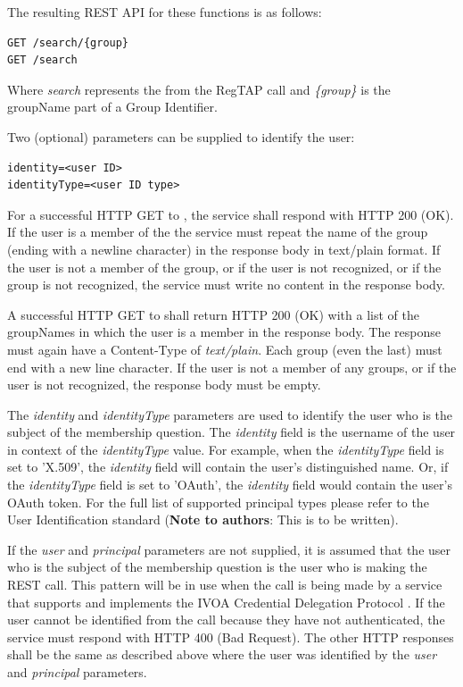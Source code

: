 \documentclass[11pt,a4paper]{ivoa}
\begin{document}
The resulting REST API for these functions is as follows:

\begin{verbatim}
GET /search/{group}
GET /search
\end{verbatim}

Where \emph{search} represents the  from the RegTAP call and \emph{\{group\}} is the groupName part of a Group Identifier.

Two (optional) parameters can be supplied to identify the user:

\begin{verbatim}
identity=<user ID>
identityType=<user ID type>
\end{verbatim}

For a successful HTTP GET to , the service shall respond with HTTP 200 (OK).  If the user is a member of the  the service must repeat the name of the group (ending with a newline character) in the response body in text/plain format.  If the user is not a member of the group, or if the user is not recognized, or if the group is not recognized, the service must write no content in the response body.

A successful HTTP GET to  shall return HTTP 200 (OK) with a list of the groupNames in which the user is a member in the response body.  The response must again have a Content-Type of \emph {text/plain}.  Each group (even the last) must end with a new line character.  If the user is not a member of any groups, or if the user is not recognized, the response body must be empty.

The \emph{identity} and \emph{identityType} parameters are used to identify the user who is the subject of the membership question.  The \emph{identity} field is the username of the user in context of the \emph{identityType} value.  For example, when the \emph{identityType} field is set to 'X.509', the \emph{identity} field will contain the user's distinguished name.  Or, if the \emph{identityType} field is set to 'OAuth', the \emph{identity} field would contain the user's OAuth token.  For the full list of supported principal types please refer to the User Identification standard (\textbf{Note to authors}: This is to be written).

If the \emph{user} and \emph{principal} parameters are not supplied, it is assumed that the user who is the subject of the membership question is the user who is making the REST call.  This pattern will be in use when the call is being made by a service that supports and implements the IVOA Credential Delegation Protocol \citep{std:CDP}.  If the user cannot be identified from the call because they have not authenticated, the service must respond with HTTP 400 (Bad Request).  The other HTTP responses shall be the same as described above where the user was identified by the \emph{user} and \emph{principal} parameters.
\end{document}
